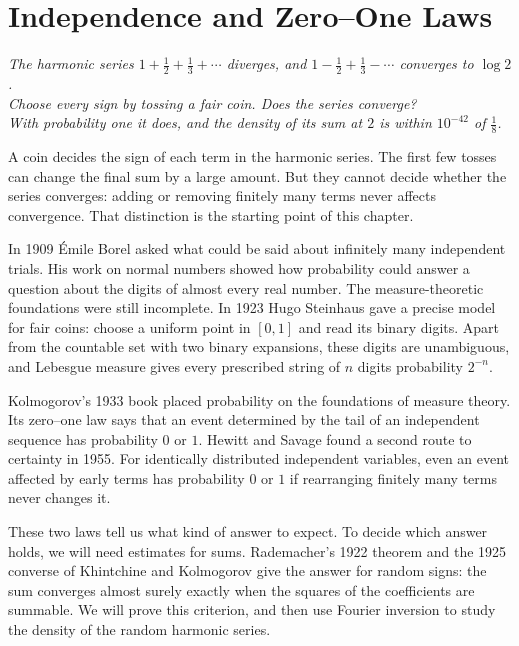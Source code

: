 \chapter{Independence and Zero--One Laws}
\begin{center}\itshape
The harmonic series $1+\frac12+\frac13+\cdots$ diverges, and $1-\frac12+\frac13-\cdots$ converges to $\log2$.\\
Choose every sign by tossing a fair coin. Does the series converge?\\
With probability one it does, and the density of its sum at $2$ is within $10^{-42}$ of $\frac18$.
\end{center}

A coin decides the sign of each term in the harmonic series. The first few tosses can change the final sum by a large amount. But they cannot decide whether the series converges: adding or removing finitely many terms never affects convergence. That distinction is the starting point of this chapter.

In 1909 \'Emile Borel asked what could be said about infinitely many independent trials. His work on normal numbers showed how probability could answer a question about the digits of almost every real number. The measure-theoretic foundations were still incomplete. In 1923 Hugo Steinhaus gave a precise model for fair coins: choose a uniform point in $[0,1]$ and read its binary digits. Apart from the countable set with two binary expansions, these digits are unambiguous, and Lebesgue measure gives every prescribed string of $n$ digits probability $2^{-n}$.

Kolmogorov's 1933 book placed probability on the foundations of measure theory. Its zero--one law says that an event determined by the tail of an independent sequence has probability $0$ or $1$. Hewitt and Savage found a second route to certainty in 1955. For identically distributed independent variables, even an event affected by early terms has probability $0$ or $1$ if rearranging finitely many terms never changes it.

These two laws tell us what kind of answer to expect. To decide which answer holds, we will need estimates for sums. Rademacher's 1922 theorem and the 1925 converse of Khintchine and Kolmogorov give the answer for random signs: the sum converges almost surely exactly when the squares of the coefficients are summable. We will prove this criterion, and then use Fourier inversion to study the density of the random harmonic series.

